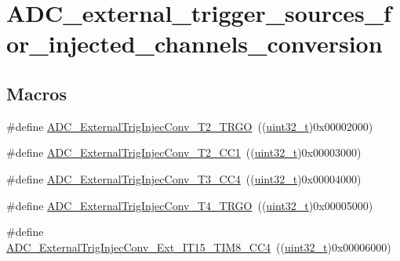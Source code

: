 \hypertarget{group___a_d_c__external__trigger__sources__for__injected__channels__conversion}{}\section{A\+D\+C\+\_\+external\+\_\+trigger\+\_\+sources\+\_\+for\+\_\+injected\+\_\+channels\+\_\+conversion}
\label{group___a_d_c__external__trigger__sources__for__injected__channels__conversion}
\subsection*{Macros}
\begin{DoxyCompactItemize}
\item 
\#define \hyperlink{group___a_d_c__external__trigger__sources__for__injected__channels__conversion_gaaad112b2b035dfd77c9743197c51b16f}{A\+D\+C\+\_\+\+External\+Trig\+Injec\+Conv\+\_\+\+T2\+\_\+\+T\+R\+GO}~((\hyperlink{_p_e___types_8h_a33594304e786b158f3fb30289278f5af}{uint32\+\_\+t})0x00002000)
\item 
\#define \hyperlink{group___a_d_c__external__trigger__sources__for__injected__channels__conversion_ga49089501c5bf2a2c22019fbca4b688e9}{A\+D\+C\+\_\+\+External\+Trig\+Injec\+Conv\+\_\+\+T2\+\_\+\+C\+C1}~((\hyperlink{_p_e___types_8h_a33594304e786b158f3fb30289278f5af}{uint32\+\_\+t})0x00003000)
\item 
\#define \hyperlink{group___a_d_c__external__trigger__sources__for__injected__channels__conversion_ga6c9ddf9bba0cefe77dbcd601aed24f7b}{A\+D\+C\+\_\+\+External\+Trig\+Injec\+Conv\+\_\+\+T3\+\_\+\+C\+C4}~((\hyperlink{_p_e___types_8h_a33594304e786b158f3fb30289278f5af}{uint32\+\_\+t})0x00004000)
\item 
\#define \hyperlink{group___a_d_c__external__trigger__sources__for__injected__channels__conversion_gab12e5503085cdb9dde4a59614e421284}{A\+D\+C\+\_\+\+External\+Trig\+Injec\+Conv\+\_\+\+T4\+\_\+\+T\+R\+GO}~((\hyperlink{_p_e___types_8h_a33594304e786b158f3fb30289278f5af}{uint32\+\_\+t})0x00005000)
\item 
\#define \hyperlink{group___a_d_c__external__trigger__sources__for__injected__channels__conversion_gaa23965b742e08142e5d1c453166dbcc2}{A\+D\+C\+\_\+\+External\+Trig\+Injec\+Conv\+\_\+\+Ext\+\_\+\+I\+T15\+\_\+\+T\+I\+M8\+\_\+\+C\+C4}~((\hyperlink{_p_e___types_8h_a33594304e786b158f3fb30289278f5af}{uint32\+\_\+t})0x00006000)

\end{DoxyCompactItemize}

